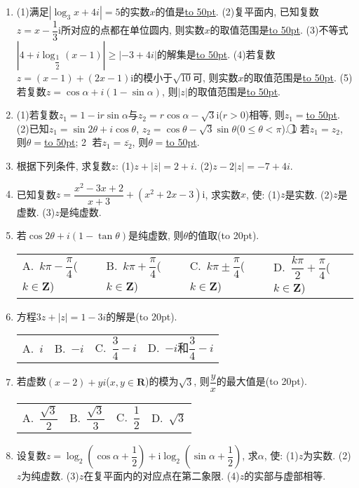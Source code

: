 \documentclass[10pt,a4paper]{article}
\newcommand{\blank}[1]{\underline{\hbox to #1pt{}}}
\newcommand{\bracket}[1]{(\hbox to #1pt{})}
\newcommand{\fourch}[4]{\par\begin{tabular}{p{.23\textwidth}p{.23\textwidth}p{.23\textwidth}p{.23\textwidth}}
A.~#1 &B.~#2& C.~#3& D.~#4
\end{tabular}}
\begin{document}
\begin{enumerate}[1.]
(2)已知$z=(2\cos \theta -\sqrt 3)+i(2\sin \theta -1)$.
\textcircled{1} 若$z\in \mathbf{R}$, 则$\theta =$\blank{50}; \textcircled{2} 若$z$是纯虚数, 则$\theta =$\blank{50}.
(3)已知复数$z=(\tan ^2\theta +\tan \theta -2)+\mathrm{i}(\cos ^2\theta -\sin ^2\theta)$.
\textcircled{1} 当$\theta =$\blank{50}时, $z$为实数; \textcircled{2} 当$\theta =$\blank{50}时, $z$为纯虚数; \textcircled{3} 当$\theta =$\blank{50}时, $z=0$.
(4)复平面内, 若复数$z=(m^2-m-2)+(m^2-3m+2)\mathrm{i}$所对应的点在虚轴上, 则实数$m$的值等于\blank{50}.
(5)复平面内, 若复数$(m^2-8m+15)+(m^2-5m-14)i$所对应的点位于第四象限, 则实数$m$的取值范围是\blank{50}.
\item (1)满足$|\log _3x+4i|=5$的实数$x$的值是\blank{50}.
(2)复平面内, 已知复数$z=x-\dfrac 13\mathrm{i}$所对应的点都在单位圆内, 则实数$x$的取值范围是\blank{50}.
(3)不等式$|4+i\log _{\dfrac 12}(x-1)|\ge|-3+4i|$的解集是\blank{50}.
(4)若复数$z=(x-1)+(2x-1)\mathrm{i}$的模小于$\sqrt {10}$可, 则实数$x$的取值范围是\blank{50}.
(5)若复数$z=\cos \alpha +i(1-\sin \alpha)$, 则$|z|$的取值范围是\blank{50}.
\item (1)若复数$z_1=1-\mathrm{i}r\sin \alpha$与$z_2=r\cos \alpha -\sqrt 3\mathrm{i}$($r>0$)相等, 则$z_1=$\blank{50}.
(2)已知$z_1=\sin 2\theta +i\cos \theta$, $z_2=\cos \theta -\sqrt 3\sin \theta$($0\le \theta <\pi$).
\textcircled{1} 若$z_1=z_2$, 则$\theta =$\blank{50}; \textcircled{2} 若$z_1=\overline{z_2}$, 则$\theta =$\blank{50}.
\item 根据下列条件, 求复数$z$:
(1)$z+|\overline z|=2+i$.
(2)$z-2|z|=-7+4i$.
\item 已知复数$z=\dfrac{{x^2}-3x+2}{x+3}+(x^2+2x-3)\mathrm{i}$, 求实数$x$, 使:
(1)$z$是实数.					(2)$z$是虚数.				(3)$z$是纯虚数.
\item 若$\cos 2\theta +i(1-\tan \theta)$是纯虚数, 则$\theta$的值取\bracket{20}.
\fourch{$k\pi -\dfrac{\pi }4$($k\in \mathbf{Z}$)}{$k\pi +\dfrac{\pi }4$($k\in \mathbf{Z}$)}{$k\pi \pm \dfrac{\pi }4$($k\in \mathbf{Z}$)}{$\dfrac{k\pi }2+\dfrac{\pi }4$($k\in \mathbf{Z}$)}
\item 方程$3z+|z|=1-3i$的解是\bracket{20}.
\fourch{$i$}{$-i$}{$\dfrac 34-i$}{$-i$和$\dfrac 34-i$}
\item 若虚数$(x-2)+yi$($x,y\in \mathbf{R}$)的模为$\sqrt 3$, 则$\dfrac yx$的最大值是\bracket{20}.
\fourch{$\dfrac{\sqrt 3}2$}{$\dfrac{\sqrt 3}3$}{$\dfrac 12$}{$\sqrt 3$}
\item 设复数$z=\log _2(\cos \alpha +\dfrac 12)+\mathrm{i}\log _2(\sin \alpha +\dfrac 12)$, 求$\alpha$, 使:
(1)$z$为实数.	(2)$z$为纯虚数.		(3)$z$在复平面内的对应点在第二象限.
(4)$z$的实部与虚部相等.

\end{enumerate}
\end{document}
